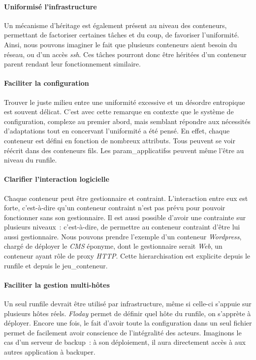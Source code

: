 \paragraph{Uniformisé l'infrastructure}
Un mécanisme d'héritage est également présent au niveau des \glspl{conteneur}, permettant de factoriser certaines tâches et du coup, de favoriser l'uniformité.
Ainsi, nous pouvons imaginer le fait que plusieurs conteneurs aient besoin du réseau, ou d'un accès \emph{ssh}.
Ces tâches pourront donc être héritées d'un conteneur parent rendant leur fonctionnement similaire.

\paragraph{Faciliter la configuration}
Trouver le juste milieu entre une uniformité excessive et un désordre entropique est souvent délicat.
C'est avec cette remarque en contexte que le système de configuration, complexe au premier abord, mais semblant répondre aux nécessités d'adaptations tout en concervant l'uniformité a été pensé.
En effet, chaque \gls{conteneur} est défini en fonction de nombreux \glspl{attribut}.
Tous peuvent se voir réécrit dans des conteneurs fils.
Les \glspl{param_applicatifs} peuvent même l'être au niveau du \gls{runfile}.

\paragraph{Clarifier l'interaction logicielle}
Chaque \gls{conteneur} peut être \gls{gestionnaire} et \gls{contraint}.
L'interaction entre eux est forte, c'est-à-dire qu'un conteneur contraint n'est pas prévu pour pouvoir fonctionner sans son gestionnaire.
Il est aussi possible d'avoir une contrainte sur plusieurs niveaux~: c'est-à-dire, de permettre au conteneur contraint d'être lui aussi gestionnaire.
Nous pouvons prendre l'exemple d'un conteneur \emph{Wordpress}, chargé de déployer le \emph{CMS} éponyme, dont le gestionnaire serait \emph{Web}, un conteneur ayant rôle de proxy \emph{HTTP}.
Cette hierarchisation est explicite depuis le \gls{runfile} et depuis le \gls{jeu_conteneur}.

\paragraph{Faciliter la gestion multi-hôtes}
Un seul \gls{runfile} devrait être utilisé par infrastructure, même si celle-ci s'appuie sur plusieurs hôtes réels.
\emph{Floday} permet de définir quel hôte du runfile, on s'apprète à déployer.
Encore une fois, le fait d'avoir toute la configuration dans un seul fichier permet de facilement avoir conscience de l'intégralité des acteurs.
Imaginons le cas d'un serveur de backup~: à son déploiement, il aura directement accès à aux autres \gls{application} à backuper.

